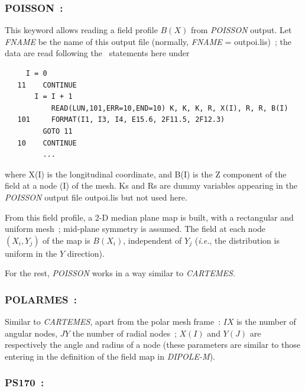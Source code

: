 {\newpage

\subsubsection*{POISSON~:\POISSONTitl} \label{POISSON} 
\medskip 

This keyword allows reading a field profile $ B(X) $ from  \textsl{POISSON} output. 
Let \textsl{FNAME} be the name of this output file (normally,
\textsl{FNAME} = outpoi.lis)~; 
the data are read following the \FORTRAN\ statements here under 

{\footnotesize
\begin{verbatim}
	 I = 0
   11    CONTINUE
	   I = I + 1
           READ(LUN,101,ERR=10,END=10) K, K, K, R, X(I), R, R, B(I) 
   101     FORMAT(I1, I3, I4, E15.6, 2F11.5, 2F12.3)
         GOTO 11     
   10    CONTINUE
         ...
\end{verbatim}}
\medskip
 
\noindent where X(I) is the longitudinal coordinate, and B(I) is the Z
component of the field at a node (I) of the mesh. Ks and Rs are dummy variables 
appearing in the \textsl{POISSON} output file outpoi.lis
 but not used here. 
\medskip

\noindent From this field profile, a 2-D median plane map is built, with a 
rectangular and uniform mesh~; mid-plane symmetry is assumed. The field at 
each node $ (X_i,Y_j) $ of the map is $ B(X_i) $, independent of $ Y_j $
(\emph{i.e.}, the distribution is uniform in the $ Y $ direction).  
\medskip

\noindent For the rest, \textsl{POISSON} works in a way similar to \textsl{CARTEMES}. 

\newpage
\subsubsection*{POLARMES~: \POLARMESTitl} \label{POLARMES} 
\medskip 

Similar to \textsl{CARTEMES}, apart from the polar 
mesh frame~: $IX$ is the number of angular nodes, $JY$ the number of 
radial nodes~; $X(I)$ and $Y(J)$ are respectively the angle and radius 
of a node (these parameters are similar to those entering in the 
definition of the field map in \textsl{DIPOLE-M}).

\newpage

\subsubsection*{PS170~: \PSusoTitl} \label{PS170} 
\medskip 

}
